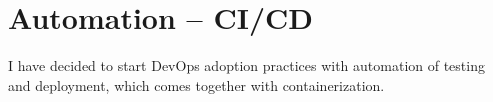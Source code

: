 \chapter{Automation -- CI/CD} I have decided to start DevOps adoption practices with automation of testing and deployment, which comes together with containerization. 










